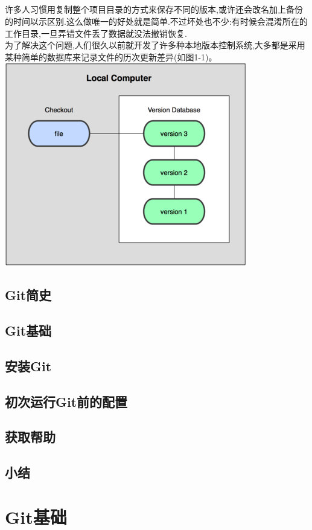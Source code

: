 \documentclass{book}
\begin{document}
	\paragraph{}
许多人习惯用复制整个项目目录的方式来保存不同的版本,或许还会改名加上备份的时间以示区别.这么做唯一的好处就是简单.不过坏处也不少:有时候会混淆所在的工作目录,一旦弄错文件丢了数据就没法撤销恢复.\\
	为了解决这个问题,人们很久以前就开发了许多种本地版本控制系统,大多都是采用某种简单的数据库来记录文件的历次更新差异(如图1-1)。\vfill
	\includegraphics{1-1.png}

	\section{Git简史}
	\section{Git基础}
	\section{安装Git}
	\section{初次运行Git前的配置}
	\section{获取帮助}
	\section{小结}

\chapter{Git基础}
\end{document}
